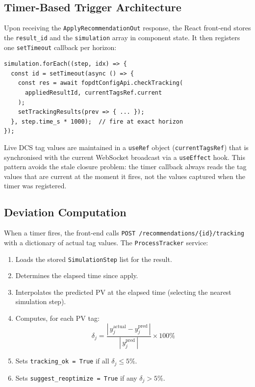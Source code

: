 \subsection{Timer-Based Trigger Architecture}

Upon receiving the \texttt{ApplyRecommendationOut} response, the React
front-end stores the \texttt{result\_id} and the \texttt{simulation} array
in component state.  It then registers one \texttt{setTimeout} callback per
horizon:

\begin{verbatim}
simulation.forEach((step, idx) => {
  const id = setTimeout(async () => {
    const res = await fopdtConfigApi.checkTracking(
      appliedResultId, currentTagsRef.current
    );
    setTrackingResults(prev => { ... });
  }, step.time_s * 1000);  // fire at exact horizon
});
\end{verbatim}

Live DCS tag values are maintained in a \texttt{useRef} object
(\texttt{currentTagsRef}) that is synchronised with the current WebSocket
broadcast via a \texttt{useEffect} hook.  This pattern avoids the stale
closure problem: the timer callback always reads the tag values that are
current at the moment it fires, not the values captured when the timer
was registered.

\subsection{Deviation Computation}

When a timer fires, the front-end calls
\texttt{POST /recommendations/\{id\}/tracking} with a dictionary of actual
tag values.  The \texttt{ProcessTracker} service:

\begin{enumerate}
  \item Loads the stored \texttt{SimulationStep} list for the result.
  \item Determines the elapsed time since apply.
  \item Interpolates the predicted PV at the elapsed time (selecting the
        nearest simulation step).
  \item Computes, for each PV tag:
  \begin{equation}
    \delta_j = \frac{|\,y_j^{\mathrm{actual}} - y_j^{\mathrm{pred}}\,|}
                    {|\,y_j^{\mathrm{pred}}\,|} \times 100\%
    \label{eq:deviation}
  \end{equation}
  \item Sets \texttt{tracking\_ok = True} if all $\delta_j \le 5\%$.
  \item Sets \texttt{suggest\_reoptimize = True} if any $\delta_j > 5\%$.
\end{enumerate}

